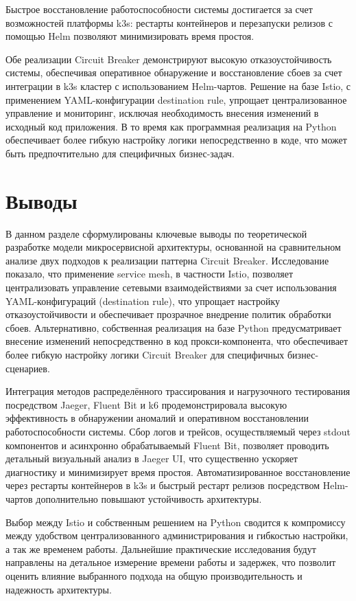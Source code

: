 Быстрое восстановление работоспособности системы достигается за счет возможностей платформы k3s: рестарты контейнеров и перезапуски релизов с помощью Helm позволяют минимизировать время простоя. 

Обе реализации Circuit Breaker демонстрируют высокую отказоустойчивость системы, обеспечивая оперативное обнаружение и восстановление сбоев за счет интеграции в k3s кластер с использованием Helm-чартов. Решение на базе Istio, с применением YAML-конфигурации destination rule, упрощает централизованное управление и мониторинг, исключая необходимость внесения изменений в исходный код приложения. В то время как программная реализация на Python обеспечивает более гибкую настройку логики непосредственно в коде, что может быть предпочтительно для специфичных бизнес-задач.  

\section{Выводы}
  

В данном разделе сформулированы ключевые выводы по теоретической разработке модели микросервисной архитектуры, основанной на сравнительном анализе двух подходов к реализации паттерна Circuit Breaker. Исследование показало, что применение service mesh, в частности Istio, позволяет централизовать управление сетевыми взаимодействиями за счет использования YAML-конфигураций (destination rule), что упрощает настройку отказоустойчивости и обеспечивает прозрачное внедрение политик обработки сбоев. Альтернативно, собственная реализация на базе Python предусматривает внесение изменений непосредственно в код прокси-компонента, что обеспечивает более гибкую настройку логики Circuit Breaker для специфичных бизнес-сценариев.

Интеграция методов распределённого трассирования и нагрузочного тестирования посредством Jaeger, Fluent Bit и k6 продемонстрировала высокую эффективность в обнаружении аномалий и оперативном восстановлении работоспособности системы. Сбор логов и трейсов, осуществляемый через stdout компонентов и асинхронно обрабатываемый Fluent Bit, позволяет проводить детальный визуальный анализ в Jaeger UI, что существенно ускоряет диагностику и минимизирует время простоя. Автоматизированное восстановление через рестарты контейнеров в k3s и быстрый рестарт релизов посредством Helm-чартов дополнительно повышают устойчивость архитектуры.

Выбор между Istio и собственным решением на Python сводится к компромиссу между удобством централизованного администрирования и гибкостью настройки, а так же временем работы. Дальнейшие практические исследования будут направлены на детальное измерение времени работы и задержек, что позволит оценить влияние выбранного подхода на общую производительность и надежность архитектуры.


